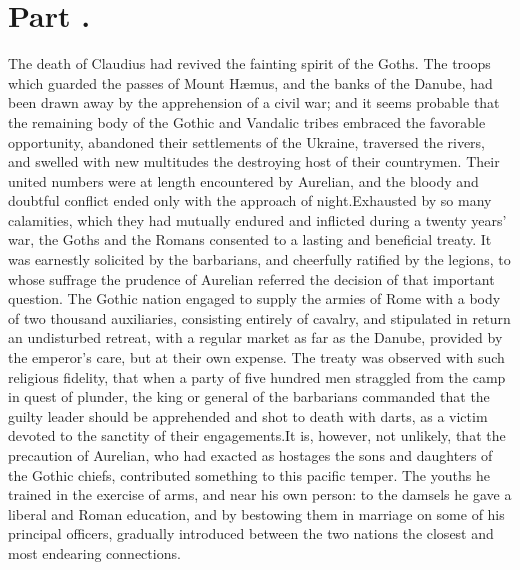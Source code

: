 \section{Part \thesection.}
\thispagestyle{simple}

The death of Claudius had revived the fainting spirit of the
Goths. The troops which guarded the passes of Mount Hæmus, and
the banks of the Danube, had been drawn away by the apprehension
of a civil war; and it seems probable that the remaining body of
the Gothic and Vandalic tribes embraced the favorable
opportunity, abandoned their settlements of the Ukraine,
traversed the rivers, and swelled with new multitudes the
destroying host of their countrymen. Their united numbers were at
length encountered by Aurelian, and the bloody and doubtful
conflict ended only with the approach of night.\footnotemark[20] Exhausted by
so many calamities, which they had mutually endured and inflicted
during a twenty years’ war, the Goths and the Romans consented to
a lasting and beneficial treaty. It was earnestly solicited by
the barbarians, and cheerfully ratified by the legions, to whose
suffrage the prudence of Aurelian referred the decision of that
important question. The Gothic nation engaged to supply the
armies of Rome with a body of two thousand auxiliaries,
consisting entirely of cavalry, and stipulated in return an
undisturbed retreat, with a regular market as far as the Danube,
provided by the emperor’s care, but at their own expense. The
treaty was observed with such religious fidelity, that when a
party of five hundred men straggled from the camp in quest of
plunder, the king or general of the barbarians commanded that the
guilty leader should be apprehended and shot to death with darts,
as a victim devoted to the sanctity of their engagements.\footnotemark[201] It
is, however, not unlikely, that the precaution of Aurelian, who
had exacted as hostages the sons and daughters of the Gothic
chiefs, contributed something to this pacific temper. The youths
he trained in the exercise of arms, and near his own person: to
the damsels he gave a liberal and Roman education, and by
bestowing them in marriage on some of his principal officers,
gradually introduced between the two nations the closest and most
endearing connections.\footnotemark[21]




